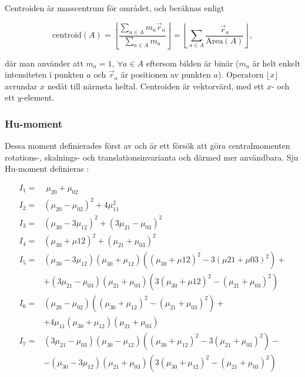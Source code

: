 \documentclass[../rapport_MVEX01-11-05]{subfiles}
\begin{document}
Centroiden är masscentrum för området, och beräknas enligt

\begin{equation*}
  \textrm{centroid}(A) = \left\lfloor\frac{
    \sum\limits_{a\in A}m_a\vec{r}_a
  }{
    \sum\limits_{a\in A}m_a
  }\right\rfloor =
  \left\lfloor\sum\limits_{a\in
  A}\frac{\vec{r}_a}{\textrm{Area}(A)}\right\rfloor,
\end{equation*}

där man använder att $m_a=1,\:\forall a\in A$ eftersom bilden är
binär ($m_a$ är helt enkelt intensiteten i punkten $a$ och
$\vec{r}_a$ är positionen av punkten $a$). Operatorn $\lfloor
x\rfloor$ avrundar $x$ nedåt till närmsta heltal. Centroiden är vektorvärd,
med ett $x$- och ett $y$-element.

\subsubsection{Hu-moment}

Dessa moment definierades först av  och är ett försök att
göra centralmomenten rotations-, skalnings- och translationsinvarianta och
därmed mer användbara. Sju Hu-moment definieras \cite[s.~185]{Hu62}:

\begin{align*}
	I_1 =& \;\mu_{20} + \mu_{02}\\
	I_2 =& \left(\mu_{20} - \mu_{02}\right)^2 + 4\mu^2_{11}\\
	I_3 =& \left(\mu_{30} - 3\mu_{12}\right)^2 +
	       \left(3\mu_{21} - \mu_{03}\right)^2\\
	I_4 =& \left(\mu_{30} + \mu{12}\right)^2 +
 	       \left(\mu_{21} + \mu_{03}\right)^2\\
	I_5 =& \left(\mu_{30} - 3\mu_{12}\right)
	       \left(\mu_{30} + \mu_{12}\right)
	       \left(\left(\mu_{30}+\mu{12}\right)^2 -
	       3\left(\mu{21}+\mu{03}\right)^2\right) + \\
 	    &+ \left(3\mu_{21} - \mu_{03}\right)\left(\mu_{21} + \mu_{03}\right)
	       \left(3\left(\mu_{30} + \mu{12}\right)^2 -
	       \left(\mu_{21} + \mu_{03}\right)^2\right)\\
	I_6 =& \left(\mu_{20}-\mu_{02}\right)
	       \left(\left(\mu_{30}+\mu_{12}\right)^2 -
	       \left(\mu_{21}+\mu_{03}\right)^2\right) + \\
	    &+ 4\mu_{11}\left(\mu_{30}+\mu_{12}\right)
	       \left(\mu_{21}+\mu_{03}\right)\\
	I_7 =& \left(3\mu_{21}-\mu_{03}\right)\left(\mu_{30}-\mu_{12}\right)
	       \left(\left(\mu_{30}+\mu_{12}\right)^2 - 
	       3\left(\mu_{21}+\mu_{03}\right)^2\right) - \\
	    &- \left(\mu_{30} - 3\mu_{12}\right)\left(\mu_{21}+\mu_{03}\right)
	       \left(3\left(\mu_{30}+\mu_{12}\right)^2 - 
  	     \left(\mu_{21}+\mu_{03}\right)^2\right)
\end{align*}
\end{document}

